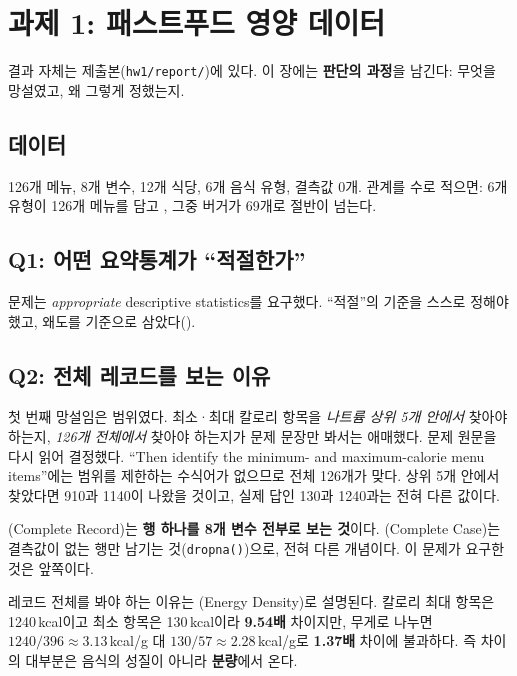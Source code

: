 \chapter{과제 1: 패스트푸드 영양 데이터}
\label{ch:hw1}

\begin{aside}
결과 자체는 제출본(\texttt{hw1/report/})에 있다. 이 장에는 \textbf{판단의 과정}을
남긴다: 무엇을 망설였고, 왜 그렇게 정했는지.
\end{aside}

\section{데이터}
\label{sec:hw1-data}

126개 메뉴, 8개 변수, 12개 식당, 6개 음식 유형, 결측값 0개.
관계를 수로 적으면: 6개 유형이 126개 메뉴를 담고 \contains, 그중 버거가 69개로
절반이 넘는다.

\section{Q1: 어떤 요약통계가 ``적절한가''}
\label{sec:hw1-q1}

문제는 \textit{appropriate} descriptive statistics를 요구했다. ``적절''의 기준을
스스로 정해야 했고, 왜도를 기준으로 삼았다().

\section{Q2: 전체 레코드를 보는 이유}
\label{sec:hw1-q2}

첫 번째 망설임은 범위였다. 최소·최대 칼로리 항목을 \emph{나트륨 상위 5개 안에서}
찾아야 하는지, \emph{126개 전체에서} 찾아야 하는지가 문제 문장만 봐서는 애매했다.
문제 원문을 다시 읽어 결정했다. ``Then identify the minimum- and maximum-calorie menu
items''에는 범위를 제한하는 수식어가 없으므로 전체 126개가 맞다. 상위 5개 안에서
찾았다면 910과 1140이 나왔을 것이고, 실제 답인 130과 1240과는 전혀 다른 값이다.

\begin{pitfall}
(Complete Record)는 \textbf{행 하나를 8개 변수 전부로 보는 것}이다.
(Complete Case)는 결측값이 없는 행만 남기는 것(\texttt{dropna()})으로,
전혀 다른 개념이다. 이 문제가 요구한 것은 앞쪽이다.
\end{pitfall}

레코드 전체를 봐야 하는 이유는 (Energy Density)로 설명된다. 칼로리
최대 항목은 1240\,kcal이고 최소 항목은 130\,kcal이라 \textbf{9.54배} 차이지만, 무게로
나누면 $1240/396 \approx 3.13$\,kcal/g 대 $130/57 \approx 2.28$\,kcal/g로 \textbf{1.37배}
차이에 불과하다. 즉 차이의 대부분은 음식의 성질이 아니라 \textbf{분량}에서 온다.

